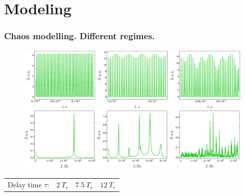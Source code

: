 \section{Modeling}


\begin{frame}
	\frametitle{Chaos modelling. Different regimes.}
	
	\begin{figure}
		\centering
		\includegraphics[width=\linewidth]{figures/chaos_and_spectra.pdf}
	\end{figure}
	
	\begin{center}
		\begin{tabular}{c|c|c}
			Delay time $\tau$:\ \   $2 \ T_r$ & $7.5 \ T_r$ & $12 \ T_r$
		\end{tabular}
	\end{center}

	
	
\end{frame}	

